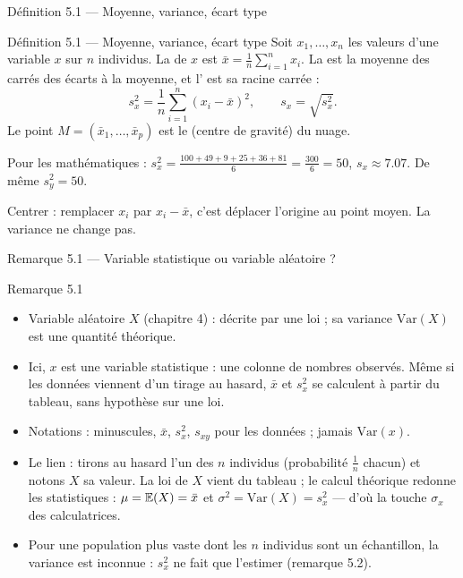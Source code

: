 \begin{frame}{Définition 5.1 --- Moyenne, variance, écart type}
  \begin{Enonce}{Définition 5.1 --- Moyenne, variance, écart type}
    Soit $x_1,\dots,x_n$ les valeurs d'une variable $x$ sur $n$ individus.
    La  de $x$ est $\bar x=\frac1n\sum_{i=1}^n x_i$. La
     est la moyenne des carrés des écarts à la moyenne, et
    l' est sa racine carrée :
    \[
      s_x^2=\frac1n\sum_{i=1}^n(x_i-\bar x)^2,\qquad s_x=\sqrt{s_x^2}.
    \]
    Le point $M=(\bar x_1,\dots,\bar x_p)$ est le  (centre
    de gravité) du nuage.
  \end{Enonce}
  \small Pour les mathématiques :
  $s_x^2=\frac{100+49+9+25+36+81}{6}=\frac{300}{6}=50$,
  $s_x\approx\num{7.07}$. De même $s_y^2=50$.
  \vspace{2pt}

  Centrer : remplacer $x_i$ par $x_i-\bar x$, c'est déplacer l'origine au
  point moyen. La variance ne change pas.
\end{frame}

\begin{frame}{Remarque 5.1 --- Variable statistique ou variable aléatoire ?}
  \begin{Rem}{Remarque 5.1}
    \small
    \begin{itemize}
      \item Variable aléatoire $X$ (chapitre 4) : décrite par une loi ; sa
        variance $\mathrm{Var}(X)$ est une quantité théorique.
      \item Ici, $x$ est une variable statistique : une colonne de nombres
        observés. Même si les données viennent d'un tirage au hasard,
        $\bar x$ et $s_x^2$ se calculent à partir du tableau, sans
        hypothèse sur une loi.
      \item Notations : minuscules, $\bar x$, $s_x^2$, $s_{xy}$ pour les
        données ; jamais $\mathrm{Var}(x)$.
      \item Le lien : tirons au hasard l'un des $n$ individus (probabilité
        $\frac1n$ chacun) et notons $X$ sa valeur. La loi de $X$ vient du
        tableau ; le calcul théorique redonne les statistiques :
        $\mu=\mathbb{E}\mathopen{}\left(X\right)\mathclose{}=\bar x$ et $\sigma^2=\mathrm{Var}(X)=s_x^2$ --- d'où la
        touche $\sigma_x$ des calculatrices.
      \item Pour une population plus vaste dont les $n$ individus sont un
        échantillon, la variance est inconnue : $s_x^2$ ne fait que
        l'estimer (remarque 5.2).
    \end{itemize}
  \end{Rem}
\end{frame}

